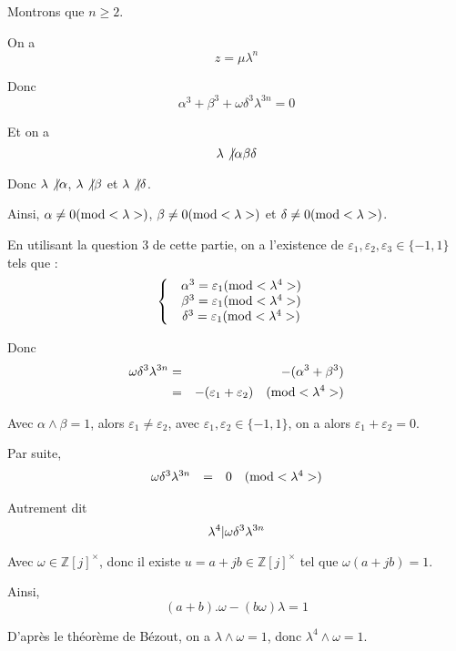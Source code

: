 Montrons que $n \geqslant 2$.

On a
\[ z = \mu \lambda^n \]


Donc
\[ \alpha^3 + \beta^3 + \omega \delta^3 \lambda^{3 n} = 0 \]


Et on a
\[ \lambda \not{| } \alpha \beta \delta \]


Donc  $\lambda \not{| } \alpha$, $\lambda \not{| } \beta$
et $\lambda \not{| } \delta$.

Ainsi, $\alpha \neq 0 (\operatorname{mod} < \lambda >)$, $\beta \neq 0 (\operatorname{mod} <
\lambda >)$ et $\delta \neq 0 (\operatorname{mod} < \lambda >)$.

En utilisant la question 3 de cette partie, on a l'existence de
$\varepsilon_1, \varepsilon_2, \varepsilon_3 \in \{ - 1, 1 \}$ tels que :
\[ \left\{\begin{array}{l}
     \begin{array}{c}
       \alpha^3 = \varepsilon_1 (\operatorname{mod} < \lambda^4 >) \text{}\\
       \beta^3 = \varepsilon_1 (\operatorname{mod} < \lambda^4 >)\\
       \delta^3 = \varepsilon_1 (\operatorname{mod} < \lambda^4 >)
     \end{array}
   \end{array}\right. \]


Donc
\begin{eqnarray*}
  \omega \delta^3 \lambda^{3 n} & = & - (\alpha^3 + \beta^3)\\
  & = & - (\varepsilon_1 + \varepsilon_2) \quad (\operatorname{mod} < \lambda^4 >)
\end{eqnarray*}


Avec $\alpha \wedge \beta = 1$, alors $\varepsilon_1 \neq \varepsilon_2$, avec
$\varepsilon_1, \varepsilon_2 \in \{ - 1, 1 \}$, on a alors $\varepsilon_1 +
\varepsilon_2 = 0$.

Par suite,
\[ \begin{array}{lll}
     \omega \delta^3 \lambda^{3 n} & = & 0 \quad (\operatorname{mod} < \lambda^4 >)
   \end{array} \]


Autrement dit
\[ \lambda^4 |  \omega \delta^3 \lambda^{3 n} \]


Avec $\omega \in \mathbb{Z} [j]^{\times}$, donc il existe $u = a + j b \in
\mathbb{Z} [j]^{\times}$ tel que $\omega (a + j b) = 1$.

Ainsi,
\[ (a + b) . \omega - (b \omega) \lambda = 1 \]


D'apr{\`e}s le th{\'e}or{\`e}me de B{\'e}zout, on a $\lambda \wedge \omega =
1$, donc $\lambda^4 \wedge \omega = 1$.


